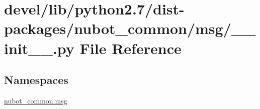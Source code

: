 \hypertarget{devel_2lib_2python2_87_2dist-packages_2nubot__common_2msg_2____init_____8py}{\section{devel/lib/python2.7/dist-\/packages/nubot\-\_\-common/msg/\-\_\-\-\_\-init\-\_\-\-\_\-.py File Reference}
\label{devel_2lib_2python2_87_2dist-packages_2nubot__common_2msg_2____init_____8py}
}
\subsection*{Namespaces}
\begin{DoxyCompactItemize}
\item 
\hyperlink{namespacenubot__common_1_1msg}{nubot\-\_\-common.\-msg}
\end{DoxyCompactItemize}
